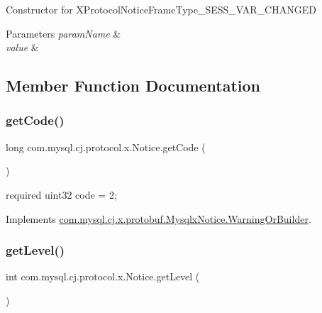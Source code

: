 Constructor for X\+Protocol\+Notice\+Frame\+Type\+\_\+\+S\+E\+S\+S\+\_\+\+V\+A\+R\+\_\+\+C\+H\+A\+N\+G\+ED


\begin{DoxyParams}{Parameters}
{\em param\+Name} & \\
\hline
{\em value} & \\
\hline
\end{DoxyParams}


\subsection{Member Function Documentation}
\mbox{\label{classcom_1_1mysql_1_1cj_1_1protocol_1_1x_1_1_notice_aa2a4395f9869d4d04470a233eefcb79f}} 
\subsubsection{\texorpdfstring{get\+Code()}{getCode()}}
{\footnotesize\ttfamily long com.\+mysql.\+cj.\+protocol.\+x.\+Notice.\+get\+Code (\begin{DoxyParamCaption}{ }\end{DoxyParamCaption})}

{\ttfamily required uint32 code = 2;} 

Implements \mbox{\hyperlink{interfacecom_1_1mysql_1_1cj_1_1x_1_1protobuf_1_1_mysqlx_notice_1_1_warning_or_builder_a80bf4dbca6d4308c375bd55ded86b996}{com.\+mysql.\+cj.\+x.\+protobuf.\+Mysqlx\+Notice.\+Warning\+Or\+Builder}}.

\mbox{\label{classcom_1_1mysql_1_1cj_1_1protocol_1_1x_1_1_notice_adfa9327778b49a0e05d9a9620263e622}} 
\subsubsection{\texorpdfstring{get\+Level()}{getLevel()}}
{\footnotesize\ttfamily int com.\+mysql.\+cj.\+protocol.\+x.\+Notice.\+get\+Level (\begin{DoxyParamCaption}{ }\end{DoxyParamCaption})}

